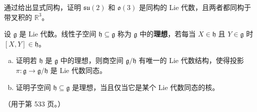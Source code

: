 \documentclass[../../main.tex]{subfiles}
\begin{document}
\begin{exercise}\label{exercise:ch08-30}
通过给出显式同构，证明 $\mathfrak{su}(2)$ 和 $\mathfrak{o}(3)$ 是同构的 Lie 代数，且两者都同构于带叉积的 $\mathbb{R}^3$。
\end{exercise}

\begin{exercise}\label{exercise:ch08-31}
设 $\mathfrak{g}$ 是 Lie 代数。线性子空间 $\mathfrak{h}\subseteq\mathfrak{g}$ 称为 $\mathfrak{g}$ 中的\textbf{理想}，若每当 $X\in\mathfrak{h}$ 且 $Y\in\mathfrak{g}$ 时 $[X,Y]\in\mathfrak{h}$。
\begin{enumerate}[(a)]
\item 证明若 $\mathfrak{h}$ 是 $\mathfrak{g}$ 中的理想，则商空间 $\mathfrak{g}/\mathfrak{h}$ 有唯一的 Lie 代数结构，使得投影 $\pi\colon\mathfrak{g}\to\mathfrak{g}/\mathfrak{h}$ 是 Lie 代数同态。
\item 证明子空间 $\mathfrak{h}\subseteq\mathfrak{g}$ 是理想，当且仅当它是某个 Lie 代数同态的核。
\end{enumerate}
（用于第 533 页。）
\end{exercise}
\end{document}
